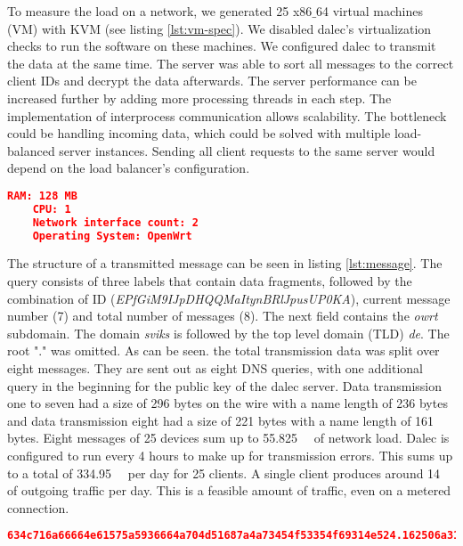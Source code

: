     To measure the load on a network, we generated 25 x86$\_$64 virtual machines (VM) with KVM (see listing \ref{lst:vm-spec}). We disabled dalec's virtualization checks to run the software on these machines. We configured dalec to transmit the data at the same time. The server was able to sort all messages to the correct client IDs and decrypt the data afterwards. The server performance can be increased further by adding more processing threads in each step. The implementation of interprocess communication allows scalability. The bottleneck could be handling incoming data, which could be solved with multiple load-balanced server instances. Sending all client requests to the same server would depend on the load balancer's configuration.\\
    \begin{lstlisting}[language=json, caption=virtual machine specifications, label=lst:vm-spec]
    RAM: 128 MB
    CPU: 1
    Network interface count: 2
    Operating System: OpenWrt
    \end{lstlisting}
    The structure of a transmitted message can be seen in listing \ref{lst:message}. The query consists of three labels that contain data fragments, followed by the combination of ID (\textit{EPfGiM9IJpDHQQMaItynBRlJpusUP0KA}), current message number (7) and total number of messages (8).     The next field contains the \textit{owrt} subdomain. The domain \textit{sviks} is followed by the top level domain (TLD) \textit{de}. The root "." was omitted.
    As can be seen. the total transmission data was split over eight messages.
    They are sent out as eight DNS queries, with one additional query in the beginning for the public key of the dalec server.
    Data transmission one to seven had a size of 296 bytes on the wire with a name length of 236 bytes and data transmission eight had a size of 221 bytes with a name length of 161 bytes. Eight messages of  25 devices sum up to \SIlist{55.825}{\kilo\byte} of network load. Dalec is configured to run every 4 hours to make up for transmission errors. 
    This sums up to a total of \SIlist{334.95}{\kilo\byte} per day for 25 clients. 
    A single client produces around \SIlist{14}{\kilo\byte} of outgoing traffic per day.
    This is a feasible amount of traffic, even on a metered connection.

    \begin{lstlisting}[language=json, caption=Layout of dalec message, label=lst:message]
634c716a66664e61575a5936664a704d51687a4a73454f53354f69314e524.162506a310a636136794752496d36794c5352626a6a464d765532636f4835.7258694279492b6b714c65507138426667596a31382b597a756d544267643.EPfGiM9IJpDHQQMaItynBRlJpusUP0KA-7-8.owrt.sviks.de
    \end{lstlisting}    
    
